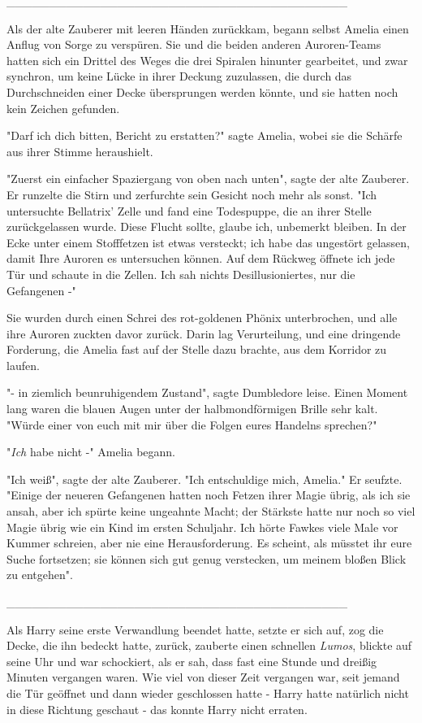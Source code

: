 {\_\_\_\_\_\_\_\_\_\_\_\_\_\_\_\_\_\_\_\_\_\_\_\_\_\_\_\_\_\_\_\_\_\_\_\_\_\_\_\_

Als der alte Zauberer mit leeren Händen zurückkam, begann selbst Amelia einen Anflug von Sorge zu verspüren. Sie und die beiden anderen Auroren-Teams hatten sich ein Drittel des Weges die drei Spiralen hinunter gearbeitet, und zwar synchron, um keine Lücke in ihrer Deckung zuzulassen, die durch das Durchschneiden einer Decke übersprungen werden könnte, und sie hatten noch kein Zeichen gefunden.

"Darf ich dich bitten, Bericht zu erstatten?" sagte Amelia, wobei sie die Schärfe aus ihrer Stimme heraushielt.

"Zuerst ein einfacher Spaziergang von oben nach unten", sagte der alte Zauberer. Er runzelte die Stirn und zerfurchte sein Gesicht noch mehr als sonst. "Ich untersuchte Bellatrix' Zelle und fand eine Todespuppe, die an ihrer Stelle zurückgelassen wurde. Diese Flucht sollte, glaube ich, unbemerkt bleiben. In der Ecke unter einem Stofffetzen ist etwas versteckt; ich habe das ungestört gelassen, damit Ihre Auroren es untersuchen können. Auf dem Rückweg öffnete ich jede Tür und schaute in die Zellen. Ich sah nichts Desillusioniertes, nur die Gefangenen -"

Sie wurden durch einen Schrei des rot-goldenen Phönix unterbrochen, und alle ihre Auroren zuckten davor zurück. Darin lag Verurteilung, und eine dringende Forderung, die Amelia fast auf der Stelle dazu brachte, aus dem Korridor zu laufen.

"- in ziemlich beunruhigendem Zustand", sagte Dumbledore leise. Einen Moment lang waren die blauen Augen unter der halbmondförmigen Brille sehr kalt. "Würde einer von euch mit mir über die Folgen eures Handelns sprechen?"

"\emph{Ich} habe nicht -" Amelia begann.

"Ich weiß", sagte der alte Zauberer. "Ich entschuldige mich, Amelia." Er seufzte. "Einige der neueren Gefangenen hatten noch Fetzen ihrer Magie übrig, als ich sie ansah, aber ich spürte keine ungeahnte Macht; der Stärkste hatte nur noch so viel Magie übrig wie ein Kind im ersten Schuljahr. Ich hörte Fawkes viele Male vor Kummer schreien, aber nie eine Herausforderung. Es scheint, als müsstet ihr eure Suche fortsetzen; sie können sich gut genug verstecken, um meinem bloßen Blick zu entgehen".

\_\_\_\_\_\_\_\_\_\_\_\_\_\_\_\_\_\_\_\_\_\_\_\_\_\_\_\_\_\_\_\_\_\_\_\_\_\_\_\_

Als Harry seine erste Verwandlung beendet hatte, setzte er sich auf, zog die Decke, die ihn bedeckt hatte, zurück, zauberte einen schnellen \emph{Lumos}, blickte auf seine Uhr und war schockiert, als er sah, dass fast eine Stunde und dreißig Minuten vergangen waren. Wie viel von dieser Zeit vergangen war, seit jemand die Tür geöffnet und dann wieder geschlossen hatte - Harry hatte natürlich nicht in diese Richtung geschaut - das konnte Harry nicht erraten.

}

